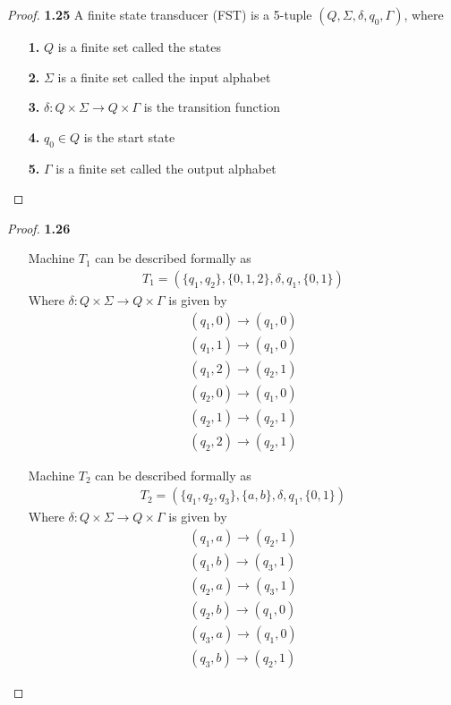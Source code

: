 \documentclass[11pt]{article}
\theoremstyle{definition}
\begin{document}
\begin{proof}{\textbf{1.25}}
    A finite state transducer (FST) is a 5-tuple $(Q, \Sigma, \delta, q_0, \Gamma)$,
    where
    \begin{itemize}
        \item [\textbf{1.}] $Q$ is a finite set called the states
        \item [\textbf{2.}] $\Sigma$ is a finite set called the input alphabet
        \item [\textbf{3.}] $\delta: Q\times \Sigma \to Q \times \Gamma$ is 
        the transition function
        \item [\textbf{4.}] $q_0 \in Q$ is the start state
        \item [\textbf{5.}] $\Gamma$ is a finite set called the output alphabet
    \end{itemize}
\end{proof}
\cleardoublepage
\begin{proof}{\textbf{1.26}}
\begin{itemize}
    \item [] Machine $T_1$ can be described formally as
    \begin{align*}
        T_1 = (\{q_1, q_2\}, \{0, 1, 2\}, \delta, q_1, \{0, 1\})
    \end{align*}
    Where $\delta: Q\times \Sigma \to Q \times \Gamma$ is given by
    \begin{align*}
        (q_1, 0) \to (q_1, 0) \\
        (q_1, 1) \to (q_1, 0) \\
        (q_1, 2) \to (q_2, 1) \\
        (q_2, 0) \to (q_1, 0) \\
        (q_2, 1) \to (q_2, 1) \\
        (q_2, 2) \to (q_2, 1)
    \end{align*}
    \item [] Machine $T_2$ can be described formally as
    \begin{align*}
        T_2 = (\{q_1, q_2, q_3\}, \{a, b\}, \delta, q_1, \{0, 1\})
    \end{align*}
    Where $\delta: Q\times \Sigma \to Q \times \Gamma$ is given by
    \begin{align*}
        (q_1, a) \to (q_2, 1) \\
        (q_1, b) \to (q_3, 1) \\
        (q_2, a) \to (q_3, 1) \\
        (q_2, b) \to (q_1, 0) \\
        (q_3, a) \to (q_1, 0) \\
        (q_3, b) \to (q_2, 1)
    \end{align*}
\end{itemize}
\end{proof}
\end{document}
